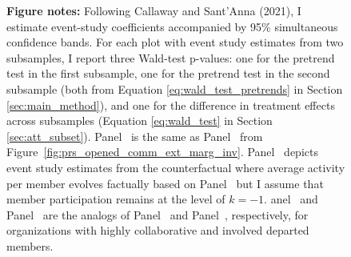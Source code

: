 \begin{figure}[htbp]
\begin{minipage}[b]{0.48\textwidth}
    \end{minipage}

  \begin{minipage}{\textwidth}
    \textbf{Figure notes:} 
    Following Callaway and Sant’Anna (2021), I estimate event-study coefficients accompanied by 95\% simultaneous confidence bands. For each plot with event study estimates from two subsamples, I report three Wald-test p-values: one for the pretrend test in the first subsample, one for the pretrend test in the second subsample (both from Equation \ref{eq:wald_test_pretrends} in Section \ref{sec:main_method}), and one for the difference in treatment effects across subsamples (Equation \ref{eq:wald_test} in Section \ref{sec:att_subset}). Panel~ is the same as Panel~ from Figure~\ref{fig:prs_opened_comm_ext_marg_inv}. Panel~ depicts event study estimates from the counterfactual where average activity per member evolves factually based on Panel~ but I assume that member participation remains at the level of $k=-1$. anel~ and Panel~ are the analogs of  Panel~  and Panel~, respectively, for organizations with highly collaborative and involved departed members. 
    
  \end{minipage}
  


\end{figure}
